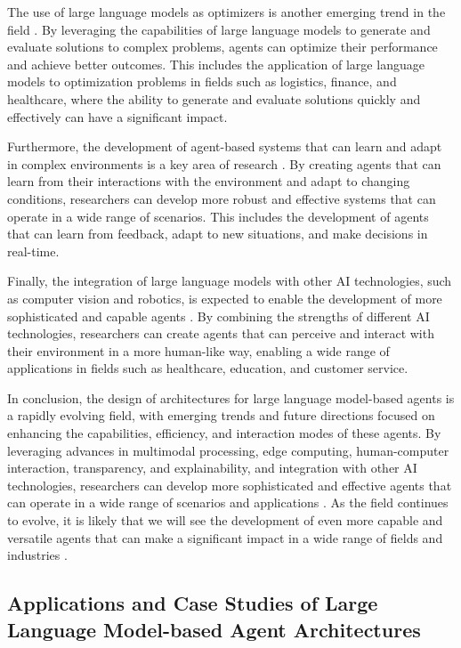 \documentclass[11pt,a4paper]{article}
\begin{document}
The use of large language models as optimizers is another emerging trend in the field \cite{arxiv:2309.03409}. By leveraging the capabilities of large language models to generate and evaluate solutions to complex problems, agents can optimize their performance and achieve better outcomes. This includes the application of large language models to optimization problems in fields such as logistics, finance, and healthcare, where the ability to generate and evaluate solutions quickly and effectively can have a significant impact.

Furthermore, the development of agent-based systems that can learn and adapt in complex environments is a key area of research \cite{arxiv:2308.03688}. By creating agents that can learn from their interactions with the environment and adapt to changing conditions, researchers can develop more robust and effective systems that can operate in a wide range of scenarios. This includes the development of agents that can learn from feedback, adapt to new situations, and make decisions in real-time.

Finally, the integration of large language models with other AI technologies, such as computer vision and robotics, is expected to enable the development of more sophisticated and capable agents \cite{arxiv:2402.01680}. By combining the strengths of different AI technologies, researchers can create agents that can perceive and interact with their environment in a more human-like way, enabling a wide range of applications in fields such as healthcare, education, and customer service.

In conclusion, the design of architectures for large language model-based agents is a rapidly evolving field, with emerging trends and future directions focused on enhancing the capabilities, efficiency, and interaction modes of these agents. By leveraging advances in multimodal processing, edge computing, human-computer interaction, transparency, and explainability, and integration with other AI technologies, researchers can develop more sophisticated and effective agents that can operate in a wide range of scenarios and applications \cite{doi:10.1145/3641289}. As the field continues to evolve, it is likely that we will see the development of even more capable and versatile agents that can make a significant impact in a wide range of fields and industries \cite{arxiv:2403.14608}.


\subsection{Applications and Case Studies of Large Language Model-based Agent Architectures}
\end{document}

